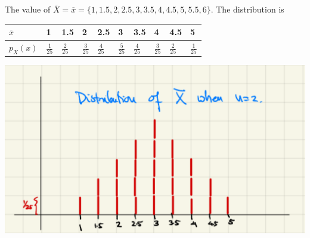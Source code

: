 \documentclass[11pt,oneside]{book}
\theoremstyle{break}
\theoremstyle{break}
\begin{document}
The value of $\overline{X}=\overline{x}=\{1,1.5,2,2.5,3,3.5,4,4.5,5,5.5,6\}$. The distribution is \begin{center}
\begin{tabular}{|l|l|l|l|l|l|l|l|l|l|}
\hline
$\overline{x}$ & 1              & 1.5            & 2              & 2.5            & 3              & 3.5            & 4              & 4.5            & 5              \\ \hline
$p_X(x)$       & $\frac{1}{25}$ & $\frac{2}{25}$ & $\frac{3}{25}$ & $\frac{4}{25}$ & $\frac{5}{25}$ & $\frac{4}{25}$ & $\frac{3}{25}$ & $\frac{2}{25}$ & $\frac{1}{25}$ \\ \hline
\end{tabular}
\end{center}
\begin{center}
\includegraphics[scale=0.3]{figures/graph_distribution}
\end{center}
\end{document}
